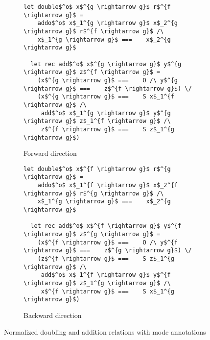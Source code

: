 \begin{figure*}[t!]
  \centering
  \vspace{1.5mm}
\begin{subfigure}[b]{0.45\textwidth}
    \begin{lstlisting}[frame=tb]
  let double$^o$ x$^{g \rightarrow g}$ r$^{f \rightarrow g}$ =
    addo$^o$ x$_1^{g \rightarrow g}$ x$_2^{g \rightarrow g}$ r$^{f \rightarrow g}$ /\
    x$_1^{g \rightarrow g}$ ===    x$_2^{g \rightarrow g}$

  let rec add$^o$ x$^{g \rightarrow g}$ y$^{g \rightarrow g}$ z$^{f \rightarrow g}$ =
    (x$^{g \rightarrow g}$ ===    O /\ y$^{g \rightarrow g}$ ===    z$^{f \rightarrow g}$) \/
    (x$^{g \rightarrow g}$ ===    S x$_1^{f \rightarrow g}$ /\
     add$^o$ x$_1^{g \rightarrow g}$ y$^{g \rightarrow g}$ z$_1^{f \rightarrow g}$ /\
     z$^{f \rightarrow g}$ ===    S z$_1^{g \rightarrow g}$)
    \end{lstlisting}
    \caption{Forward direction}
    \label{fig:double_fwd}
  \end{subfigure}
\hfill
  \begin{subfigure}[b]{0.45\textwidth}
    \begin{lstlisting}[frame=tb]
  let double$^o$ x$^{f \rightarrow g}$ r$^{g \rightarrow g}$ =
    addo$^o$ x$_1^{f \rightarrow g}$ x$_2^{f \rightarrow g}$ r$^{g \rightarrow g}$ /\
    x$_1^{g \rightarrow g}$ ===    x$_2^{g \rightarrow g}$

  let rec add$^o$ x$^{f \rightarrow g}$ y$^{f \rightarrow g}$ z$^{g \rightarrow g}$ =
    (x$^{f \rightarrow g}$ ===    O /\ y$^{f \rightarrow g}$ ===    z$^{g \rightarrow g}$) \/
    (z$^{f \rightarrow g}$ ===    S z$_1^{g \rightarrow g}$ /\
     add$^o$ x$_1^{f \rightarrow g}$ y$^{f \rightarrow g}$ z$_1^{g \rightarrow g}$ /\
     x$^{f \rightarrow g}$ ===    S x$_1^{g \rightarrow g}$)
    \end{lstlisting}
    \caption{Backward direction}
    \label{fig:double_bw}
  \end{subfigure}
  \caption{Normalized doubling and addition relations with mode annotations}
  \label{fig:double_modded}
\end{figure*}
